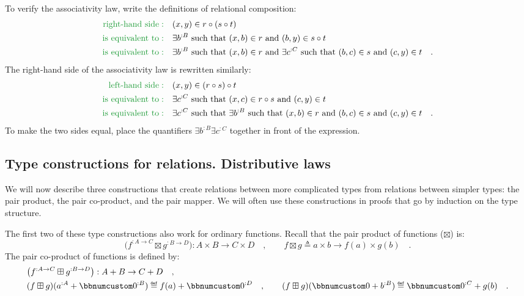 To verify the associativity law, write the definitions of relational
composition:
\begin{align*}
{\color{greenunder}\text{right-hand side}:}\quad & (x,y)\in r\circ(s\circ t)\\
{\color{greenunder}\text{is equivalent to}:}\quad & \exists b^{:B}\text{ such that }(x,b)\in r\text{ and }(b,y)\in s\circ t\\
{\color{greenunder}\text{is equivalent to}:}\quad & \exists b^{:B}\text{ such that }(x,b)\in r\text{ and }\exists c^{:C}\text{ such that }(b,c)\in s\text{ and }(c,y)\in t\quad.
\end{align*}
The right-hand side of the associativity law is rewritten similarly:
\begin{align*}
{\color{greenunder}\text{left-hand side}:}\quad & (x,y)\in(r\circ s)\circ t\\
{\color{greenunder}\text{is equivalent to}:}\quad & \exists c^{:C}\text{ such that }(x,c)\in r\circ s\text{ and }(c,y)\in t\\
{\color{greenunder}\text{is equivalent to}:}\quad & \exists c^{:C}\text{ such that }\exists b^{:B}\text{ such that }(x,b)\in r\text{ and }(b,c)\in s\text{ and }(c,y)\in t\quad.
\end{align*}
To make the two sides equal, place the quantifiers $\exists b^{:B}\exists c^{:C}$
together in front of the expression.

\subsection{Type constructions for relations. Distributive laws}

We will now describe three constructions that create relations between
more complicated types from relations between simpler types: the pair
product, the pair co-product, and the pair mapper. We will often use
these constructions in proofs that go by induction on the type structure.

The first two of these type constructions also work for ordinary functions.
Recall that the pair product of functions
($\boxtimes$) is:
\[
\big(f^{:A\rightarrow C}\boxtimes g^{:B\rightarrow D}\big):A\times B\rightarrow C\times D\quad,\quad\quad f\boxtimes g\triangleq a\times b\rightarrow f(a)\times g(b)\quad.
\]
The pair co-product of functions
is defined by:
\begin{align*}
 & \big(f^{:A\rightarrow C}\boxplus g^{:B\rightarrow D}\big):A+B\rightarrow C+D\quad,\\
 & (f\boxplus g)(a^{:A}+\bbnum 0^{:B})\triangleq f(a)+\bbnum 0^{:D}\quad,\quad\quad(f\boxplus g)(\bbnum 0+b^{:B})\triangleq\bbnum 0^{:C}+g(b)\quad.
\end{align*}

